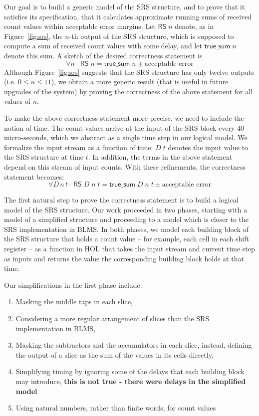 \documentclass{llncs}
\begin{document}
Our goal is to build a generic model of the SRS structure, and to prove that it satisfies its specification, that it calculates approximate running sums of received count values within acceptable error margins.
Let $\mathsf{RS}\;n$ denote, as in Figure~\ref{fig:srs}, the $n$-th output of the SRS structure, which is supposed to compute a sum of received count values with some delay, and let $\mathsf{true\_sum}\;n$ denote this sum.
A sketch of the desired correctness statement is \[\forall{n} \cdot \, \mathsf{RS}\;n= \mathsf{true\_sum}\; n \pm\text{acceptable error}\]
Although Figure~\ref{fig:srs} suggests that the SRS structure has only twelve outputs  (i.e. $0\leq{n}\leq11$), we obtain a more generic result (that is useful in future upgrades of the system) by proving the correctness of the above statement for all values of $n$.

To make the above correctness statement more precise, we need to include the notion of time.
The count values arrive at the input of the SRS block every 40 micro-seconds, which we abstract as a single time step in our logical model.
We formalize the input stream as a function of time: $D\;t$ denotes the input value to the SRS structure at time $t$.
In addition, the terms in the above statement depend on this stream of input counts.
With these refinements, the correctness statement becomes: \[\forall{D\,n\,t} \cdot \,\mathsf{RS}\;D\;n\;t = \mathsf{true\_sum}\;D\;n\;t\pm\text{acceptable error}\]

The first natural step to prove the correctness statement is to build a logical model of the SRS structure.
Our work proceeded in two phases, starting with a model of a simplified structure and proceeding to a model which is closer to the SRS implementation in BLMS.
In both phases, we model each building block of the SRS structure that holds a count value -- for example, each cell in each shift register -- as a function in HOL that takes the input stream and current time step as inputs and returns the value the corresponding building block holds at that time.

Our simplifications in the first phase include:
\begin{enumerate}
\item Masking the middle taps in each slice,
\item Considering a more regular arrangement of slices than the SRS implementation in BLMS,
\item Masking the subtractors and the accumulators in each slice, instead, defining the output of a slice as the sum of the values in its cells directly,
\item Simplifying timing by ignoring some of the delays that each building block may introduce, {\bf this is not true - there were delays in the simplified model}
\item Using natural numbers, rather than finite words, for count values
\end{enumerate}
\end{document}
